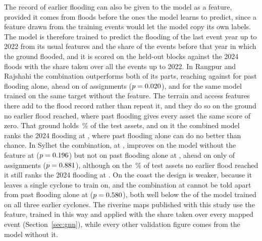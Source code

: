 The record of earlier flooding can also be given to the model as a feature, provided it comes from floods before the ones the model learns to predict, since a feature drawn from the training events would let the model copy its own labels. The model is therefore trained to predict the flooding of the last event year up to 2022 from its usual features and the share of the events before that year in which the ground flooded, and it is scored on the held-out blocks against the 2024 floods with the share taken over all the events up to 2022. In Rangpur and Rajshahi the combination outperforms both of its parts, reaching \RRPastFeatAUC{} against \RRPastFeatOnlyAUC{} for past flooding alone, ahead on \RRPastFeatOverPastAhead{} of \RRTempSeeds{} assignments ($p=0.020{}$), and \RRPastFeatWithoutAUC{} for the same model trained on the same target without the feature. The terrain and access features there add to the flood record rather than repeat it, and they do so on the ground no earlier flood reached, where past flooding gives every asset the same score of zero. That ground holds \RRPastFeatUnseenShare{}\,\% of the test assets, and on it the combined model ranks the 2024 flooding at \RRPastFeatUnseenAUC{}, where past flooding alone can do no better than chance. In Sylhet the combination, at \SylhetPastFeatAUC{}, improves on the model without the feature at \SylhetPastFeatWithoutAUC{} ($p=0.196{}$) but not on past flooding alone at \SylhetPastFeatOnlyAUC{}, ahead on only \SylhetPastFeatOverPastAhead{} of \RRTempSeeds{} assignments ($p=0.881{}$), although on the \SylhetPastFeatUnseenShare{}\,\% of test assets no earlier flood reached it still ranks the 2024 flooding at \SylhetPastFeatUnseenAUC{}. On the coast the design is weaker, because it leaves a single cyclone to train on, and the combination at \CoastalPastFeatAUC{} cannot be told apart from past flooding alone at \CoastalPastFeatOnlyAUC{} ($p=0.580{}$), both well below the \CoastalTempAUC{} of the model trained on all three earlier cyclones. The riverine maps published with this study use the feature, trained in this way and applied with the share taken over every mapped event (Section~\ref{sec:gnn}), while every other validation figure comes from the model without it.

